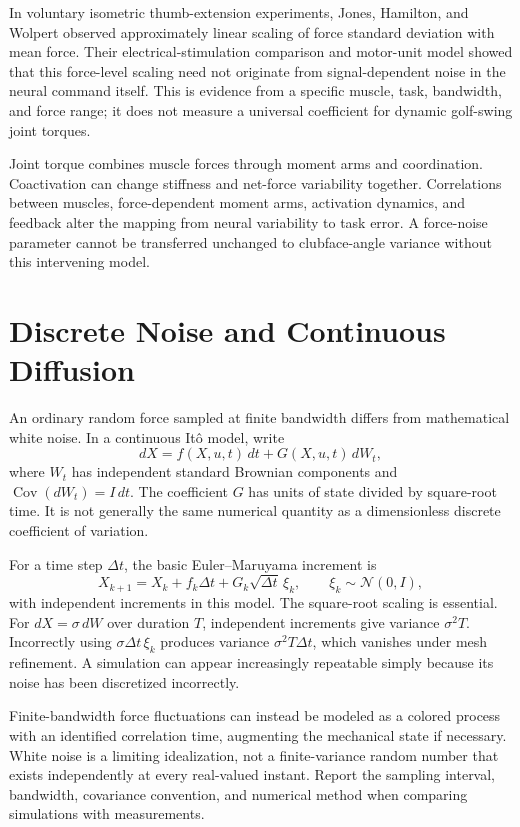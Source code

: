 In voluntary isometric thumb-extension experiments, Jones, Hamilton, and Wolpert observed approximately linear scaling of force standard deviation with mean force. Their electrical-stimulation comparison and motor-unit model showed that this force-level scaling need not originate from signal-dependent noise in the neural command itself. This is evidence from a specific muscle, task, bandwidth, and force range; it does not measure a universal coefficient for dynamic golf-swing joint torques.

Joint torque combines muscle forces through moment arms and coordination. Coactivation can change stiffness and net-force variability together. Correlations between muscles, force-dependent moment arms, activation dynamics, and feedback alter the mapping from neural variability to task error. A force-noise parameter cannot be transferred unchanged to clubface-angle variance without this intervening model.

\section{Discrete Noise and Continuous Diffusion}

An ordinary random force sampled at finite bandwidth differs from mathematical white noise. In a continuous Itô model, write
\begin{equation}
dX=f(X,u,t)\,dt+G(X,u,t)\,dW_t ,
\end{equation}
where $W_t$ has independent standard Brownian components and $\operatorname{Cov}(dW_t)=I\,dt$. The coefficient $G$ has units of state divided by square-root time. It is not generally the same numerical quantity as a dimensionless discrete coefficient of variation.

For a time step $\Delta t$, the basic Euler--Maruyama increment is
\begin{equation}
X_{k+1}=X_k+f_k\Delta t+G_k\sqrt{\Delta t}\,\xi_k,\qquad
\xi_k\sim\mathcal N(0,I),
\end{equation}
with independent increments in this model. The square-root scaling is essential. For $dX=\sigma\,dW$ over duration $T$, independent increments give variance $\sigma^2T$. Incorrectly using $\sigma\Delta t\,\xi_k$ produces variance $\sigma^2T\Delta t$, which vanishes under mesh refinement. A simulation can appear increasingly repeatable simply because its noise has been discretized incorrectly.

Finite-bandwidth force fluctuations can instead be modeled as a colored process with an identified correlation time, augmenting the mechanical state if necessary. White noise is a limiting idealization, not a finite-variance random number that exists independently at every real-valued instant. Report the sampling interval, bandwidth, covariance convention, and numerical method when comparing simulations with measurements.

